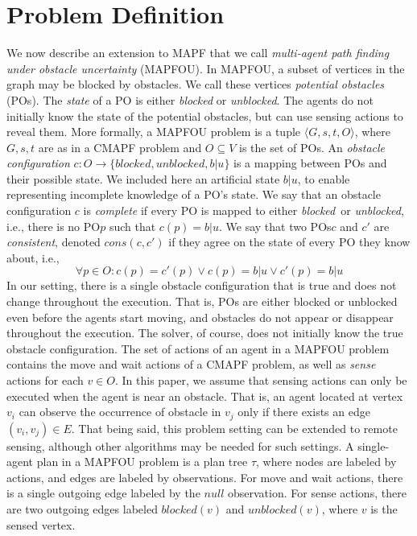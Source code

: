 \documentclass[letterpaper]{article} %
\newcommand{\blocked}{\textit{blocked}}
\newcommand{\unblocked}{\textit{unblocked}}
\newcommand{\unknown}{\textit{b}|\textit{u}}
\newcommand{\po}{PO\xspace}
\newcommand{\pos}{POs\xspace}
\newcommand{\cons}{\textit{cons}}
\begin{document}
\section{Problem Definition}
We now describe an extension to MAPF that we call \emph{multi-agent path finding under obstacle uncertainty} (MAPFOU). In MAPFOU, a subset of vertices in the graph may be blocked by obstacles. We call these vertices \emph{potential obstacles} (\pos). The \emph{state} of a \po is either \emph{blocked} or \emph{unblocked}.
The agents do not initially know the state of the potential obstacles, but can use sensing actions to reveal them.
More formally, a MAPFOU problem is a tuple $\langle G,s,t,O\rangle$,
where $G,s,t$ are as in a CMAPF problem and $O \subseteq V$ is the set of \pos.
An \emph{obstacle configuration} $c:O\rightarrow\{\blocked, \unblocked, \unknown\}$ is a mapping between \pos and their possible state.
We included here an artificial state $\unknown$, to enable representing incomplete knowledge of a \po's state.
We say that an obstacle configuration $c$ is \emph{complete} if every \po is mapped to either \blocked\ or \unblocked, i.e., there is no \po $p$ such that $c(p)=\unknown$.
We say that two \pos $c$ and $c'$ are \emph{consistent}, denoted $\cons(c,c')$ if they agree on the state of every \po they know about, i.e.,
\begin{equation}
    \forall p\in O: c(p)=c'(p)\vee c(p)=\unknown \vee c'(p)=\unknown
    \label{eq:consistent}
\end{equation}
In our setting, there is a single obstacle configuration that is true and does not change throughout the execution. That is, \pos are either blocked or unblocked even before the agents start moving, and obstacles do not appear or disappear throughout the execution. The solver, of course, does not initially know the true obstacle configuration.
The set of actions of an agent in a MAPFOU problem contains the move and wait actions of a CMAPF problem, as well as \emph{sense} actions for each $v \in O$.
In this paper, we assume that sensing actions can only be executed when the agent is near an obstacle. That is, an agent located at vertex $v_i$ can observe the occurrence of obstacle in $v_j$ only if there exists an edge $(v_i, v_j) \in E$. That being said, this problem setting can be extended to remote sensing, although other algorithms may be needed for such settings.
A single-agent plan in a MAPFOU problem is a plan tree $\tau$, where nodes are labeled by actions, and edges are labeled by observations. For move and wait actions, there is a single outgoing edge labeled by the $null$ observation. For sense actions, there are two outgoing edges labeled $\blocked(v)$ and $\unblocked(v)$, where $v$ is the sensed vertex.
\end{document}
